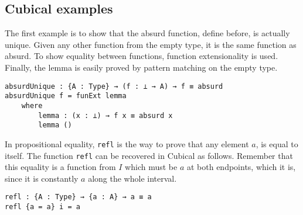 \subsection{Cubical examples}
The first example is to show that the absurd function, define before, is actually unique. Given any other function from the empty type, it is the same function as absurd. To show equality between functions, function extensionality is used. Finally, the lemma is easily proved by pattern matching on the empty type.

\begin{verbatim}
absurdUnique : {A : Type} → (f : ⊥ → A) → f ≡ absurd
absurdUnique f = funExt lemma
    where
        lemma : (x : ⊥) → f x ≡ absurd x
        lemma ()
\end{verbatim}

In propositional equality, \texttt{refl} is the way to prove that any element $a$, is equal to itself. The function \texttt{refl} can be recovered in Cubical as follows. Remember that this equality is a function from $I$ which must be $a$ at both endpoints, which it is, since it is constantly $a$ along the whole interval.

\begin{verbatim}
refl : {A : Type} → {a : A} → a ≡ a
refl {a = a} i = a
\end{verbatim}






